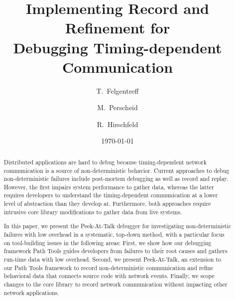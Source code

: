 \documentclass[preprint,3p]{elsarticle}
\newcommand{\toolname}{Peek-At-Talk\xspace}
\newcommand{\doctitle}{Implementing Record and Refinement for\\
  Debugging Timing-dependent Communication}
\begin{document}
\begin{frontmatter}

\title{\doctitle}
\author[hpi]{T.~Felgentreff}
\author[hpi]{M.~Perscheid}
\author[hpi]{R.~Hirschfeld}

\address[hpi]{Software Architecture Group,~%
  Hasso-Plattner Institute,\\%
  Prof.-Dr.-Helmert Str. 2-3,~%
  University of Potsdam, Germany%
}
\date{\today}

\begin{abstract}
Distributed applications are hard to debug because timing-dependent
network communication is a source of non-deterministic behavior.
%
%
%
Current approaches to debug non-deterministic failures include
post-mortem debugging as well as record and replay.
%
However, the first impairs system performance to gather data, whereas
the latter requires developers to understand the timing-dependent
communication at a lower level of abstraction than they develop
at. Furthermore, both approaches require intrusive core library
modifications to gather data from live systems.
%

In this paper, we present the \toolname debugger for investigating
non-deterministic failures with low overhead in a systematic, top-down
method, with a particular focus on tool-building issues in the
following areas: 
%
First, we show how our debugging framework Path Tools guides developers from
failures to their root causes and gathers run-time data with low overhead.
%
Second, we present \toolname, an extension to our Path Tools framework to record
non-deterministic communication and refine behavioral data that connects source
code with network events.
%
Finally, we scope changes to the core library to record network communication
without impacting other network applications.


\end{abstract}
\end{frontmatter}
\end{document}
